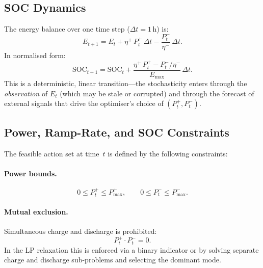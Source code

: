 \subsection{SOC Dynamics}
\label{sec:soc-dynamics}

The energy balance over one time step ($\Delta t = 1$\,h) is:
\begin{equation}
\label{eq:soc-dynamics-battery}
  E_{t+1} = E_t + \eta^{+}\,P_t^{+}\,\Delta t
                 - \frac{P_t^{-}}{\eta^{-}}\,\Delta t.
\end{equation}
In normalised form:
\begin{equation}
\label{eq:soc-normalised}
  \mathrm{SOC}_{t+1} = \mathrm{SOC}_t
    + \frac{\eta^{+}\,P_t^{+} - P_t^{-}/\eta^{-}}{E_{\max}}\,\Delta t.
\end{equation}
This is a deterministic, linear transition---the stochasticity enters through
the \emph{observation} of $E_t$ (which may be stale or corrupted) and through
the forecast of external signals that drive the optimiser's choice of
$(P_t^{+}, P_t^{-})$.

\subsection{Power, Ramp-Rate, and SOC Constraints}
\label{sec:constraints}

The feasible action set at time~$t$ is defined by the following constraints:

\paragraph{Power bounds.}
\begin{equation}
\label{eq:power-bounds}
  0 \le P_t^{+} \le P_{\max}^{+}, \qquad
  0 \le P_t^{-} \le P_{\max}^{-}.
\end{equation}

\paragraph{Mutual exclusion.}
Simultaneous charge and discharge is prohibited:
\begin{equation}
\label{eq:mutual-exclusion}
  P_t^{+} \cdot P_t^{-} = 0.
\end{equation}
In the LP relaxation this is enforced via a binary indicator or by solving
separate charge and discharge sub-problems and selecting the dominant mode.

